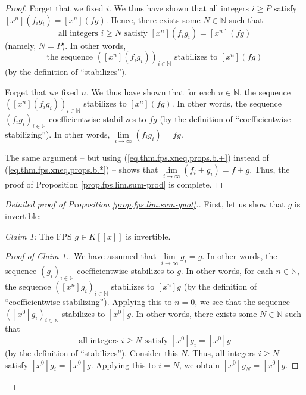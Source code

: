 \begin{fineprint}
\begin{proof}
Forget that we fixed $i$. We thus have shown that all integers $i\geq P$
satisfy $\left[  x^{n}\right]  \left(  f_{i}g_{i}\right)  =\left[
x^{n}\right]  \left(  fg\right)  $. Hence, there exists some $N\in\mathbb{N}$
such that%
\[
\text{all integers }i\geq N\text{ satisfy }\left[  x^{n}\right]  \left(
f_{i}g_{i}\right)  =\left[  x^{n}\right]  \left(  fg\right)
\]
(namely, $N=P$). In other words,%
\[
\text{the sequence }\left(  \left[  x^{n}\right]  \left(  f_{i}g_{i}\right)
\right)  _{i\in\mathbb{N}}\text{ stabilizes to }\left[  x^{n}\right]  \left(
fg\right)
\]
(by the definition of \textquotedblleft stabilizes\textquotedblright).

Forget that we fixed $n$. We thus have shown that for each $n\in\mathbb{N}$,
the sequence $\left(  \left[  x^{n}\right]  \left(  f_{i}g_{i}\right)
\right)  _{i\in\mathbb{N}}$ stabilizes to $\left[  x^{n}\right]  \left(
fg\right)  $. In other words, the sequence $\left(  f_{i}g_{i}\right)
_{i\in\mathbb{N}}$ coefficientwise stabilizes to $fg$ (by the definition of
\textquotedblleft coefficientwise stabilizing\textquotedblright). In other
words, $\lim\limits_{i\rightarrow\infty}\left(  f_{i}g_{i}\right)  =fg$.

The same argument -- but using (\ref{eq.thm.fps.xneq.props.b.+}) instead of
(\ref{eq.thm.fps.xneq.props.b.*}) -- shows that $\lim\limits_{i\rightarrow
\infty}\left(  f_{i}+g_{i}\right)  =f+g$. Thus, the proof of Proposition
\ref{prop.fps.lim.sum-prod} is complete.
\end{proof}

\begin{proof}
[Detailed proof of Proposition \ref{prop.fps.lim.sum-quot}.]First, let us show
that $g$ is invertible:

\begin{statement}
\textit{Claim 1:} The FPS $g\in K\left[  \left[  x\right]  \right]  $ is invertible.
\end{statement}

\begin{proof}
[Proof of Claim 1.]We have assumed that $\lim\limits_{i\rightarrow\infty}%
g_{i}=g$. In other words, the sequence $\left(  g_{i}\right)  _{i\in
\mathbb{N}}$ coefficientwise stabilizes to $g$. In other words, for each
$n\in\mathbb{N}$, the sequence $\left(  \left[  x^{n}\right]  g_{i}\right)
_{i\in\mathbb{N}}$ stabilizes to $\left[  x^{n}\right]  g$ (by the definition
of \textquotedblleft coefficientwise stabilizing\textquotedblright). Applying
this to $n=0$, we see that the sequence $\left(  \left[  x^{0}\right]
g_{i}\right)  _{i\in\mathbb{N}}$ stabilizes to $\left[  x^{0}\right]  g$. In
other words, there exists some $N\in\mathbb{N}$ such that%
\[
\text{all integers }i\geq N\text{ satisfy }\left[  x^{0}\right]  g_{i}=\left[
x^{0}\right]  g
\]
(by the definition of \textquotedblleft stabilizes\textquotedblright).
Consider this $N$. Thus, all integers $i\geq N$ satisfy $\left[  x^{0}\right]
g_{i}=\left[  x^{0}\right]  g$. Applying this to $i=N$, we obtain $\left[
x^{0}\right]  g_{N}=\left[  x^{0}\right]  g$.


\end{proof}
\end{proof}
\end{fineprint}
